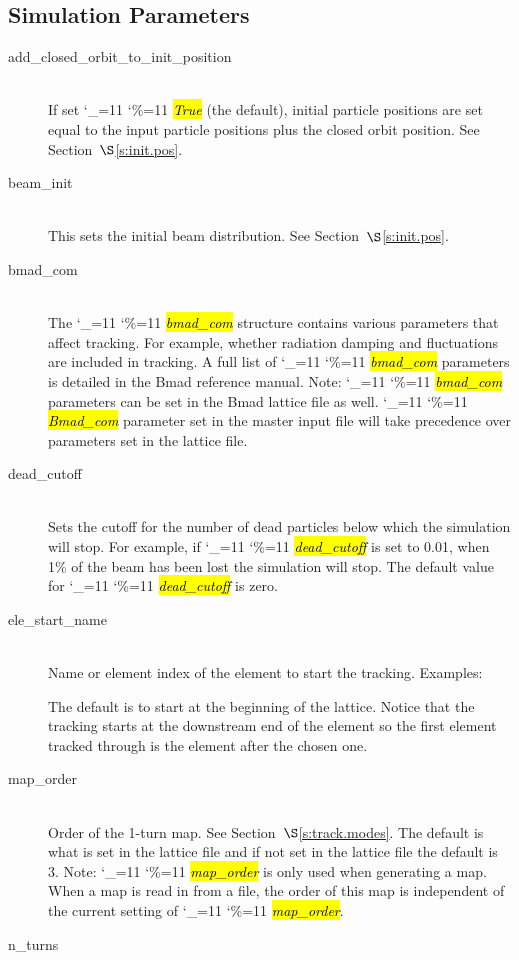 \documentclass{hitec}
\newcommand\dottcmd[1]{\hl{\em#1}\endgroup}
\newcommand{\vn}{\begingroup\catcode`\_=11 \catcode`\%=11 \dottcmd}
\newcommand{\Newline}{\hfil \\}
\newcommand{\sref}[1]{$\S$\ref{#1}}
\begin{document}
{{{{{{%
\subsection{Simulation Parameters}

\begin{description}
\item[add_closed_orbit_to_init_position] \Newline
If set \vn{True} (the default), initial particle positions are set equal to the input particle positions
plus the closed orbit position. See Section~\sref{s:init.pos}.
%
\item[beam_init] \Newline
This sets the initial beam distribution. See Section~\sref{s:init.pos}.
%
\item[bmad_com] \Newline
The \vn{bmad_com} structure contains various parameters that affect tracking. For example, whether
radiation damping and fluctuations are included in tracking. A full list of \vn{bmad_com} parameters
is detailed in the Bmad reference manual. Note: \vn{bmad_com} parameters can be set in the Bmad
lattice file as well. \vn{Bmad_com} parameter set in the master input file will take precedence over
parameters set in the lattice file.
%
\item[dead_cutoff] \Newline
Sets the cutoff for the number of dead particles below which the simulation will stop. For example,
if \vn{dead_cutoff} is set to 0.01, when 1\% of the beam has been lost the simulation will stop. The
default value for \vn{dead_cutoff} is zero.
%
\item[ele_start_name] \Newline
Name or element index of the element to start the tracking. Examples:
The default is to start at the beginning of the lattice. Notice that the tracking starts at the
downstream end of the element so the first element tracked through is the element after the chosen
one.
%
\item[map_order] \Newline
Order of the 1-turn map. See Section~\sref{s:track.modes}. The default is what is set in the lattice
file and if not set in the lattice file the default is 3. Note: \vn{map_order} is only used when
generating a map.  When a map is read in from a file, the order of this map is independent of the
current setting of \vn{map_order}.
%
\item[n_turns] \Newline

\end{description}}}}}}}
\end{document}
